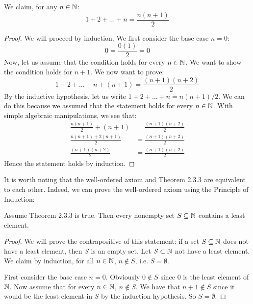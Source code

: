 \begin{example}
   We claim, for any $n \in \mathbb{N}$:
   \[ 1 + 2 + \dots + n = \frac{n(n+1)}{2} \]
\end{example}
\begin{proof}
   We will proceed by induction. We first consider the base case $n = 0$:
   \[ 0 = \frac{0(1)}{2} = 0 \]
   Now, let us assume that the condition holds for every $n \in \mathbb{N}$. We want to show the condition holds for $n + 1$. We now want to prove:
   \[ 1 + 2 + \dots + n + (n + 1) = \frac{(n+1)(n+2)}{2} \]
   By the inductive hypothesis, let us write $1 + 2 + \dots + n = n(n+1)/2$. We can do this because we assumed that the statement holds for every $n \in \mathbb{N}$. With simple algebraic manipulations, we see that:
   \begin{align*}
      \frac{n(n+1)}{2} + (n+1) &= \frac{(n+1)(n+2)}{2} \\
      \frac{n(n+1) + 2(n+1)}{2} &= \frac{(n+1)(n+2)}{2} \\
     \frac{(n+1)(n+2)}{2}        &= \frac{(n+1)(n+2)}{2}
  \end{align*}
  Hence the statement holds by induction.
\end{proof}

It is worth noting that the well-ordered axiom and Theorem 2.3.3 are equivalent to each other. Indeed, we can prove the well-ordered axiom using the Principle of Induction:

\begin{thmbox}
   Assume Theorem 2.3.3 is true. Then every nonempty set $S \subseteq \mathbb{N}$ contains a least element. 
\end{thmbox}
\begin{proof}
   We will prove the contrapositive of this statement: if a set $S \subseteq \mathbb{N}$ does not have a least element, then $S$ is an empty set. Let $S \subset \mathbb{N}$ not have a least element. We claim by induction, for all $n \in \mathbb{N}$, $n \notin S$, i.e. $S = \emptyset$. 

   First consider the base case $n = 0$. Obviously $0 \notin S$ since $0$ is the least element of $\mathbb{N}$. Now assume that for every $n \in \mathbb{N}$, $n \notin S$. We have that $n + 1 \notin S$ since it would be the least element in $S$ by the induction hypothesis. So $S = \emptyset$.   
\end{proof}




